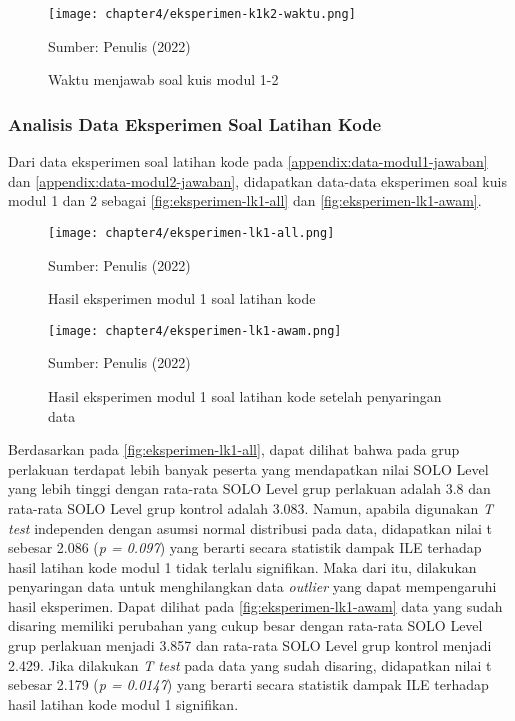 \begin{figure}[!h]
  \centering
  \texttt{[image: chapter4/eksperimen-k1k2-waktu.png]}
  \caption{Waktu menjawab soal kuis modul 1-2} \label{fig:eksperimen-k1k2-waktu}
  Sumber: Penulis (2022)
\end{figure}

\subsubsection{Analisis Data Eksperimen Soal Latihan Kode}

Dari data eksperimen soal latihan kode pada \autoref{appendix:data-modul1-jawaban} dan \autoref{appendix:data-modul2-jawaban}, didapatkan data-data eksperimen soal kuis modul 1 dan 2 sebagai \autoref{fig:eksperimen-lk1-all} dan \autoref{fig:eksperimen-lk1-awam}.

\begin{figure}[!h]
  \centering
  \texttt{[image: chapter4/eksperimen-lk1-all.png]}
  \caption{Hasil eksperimen modul 1 soal latihan kode} \label{fig:eksperimen-lk1-all}
  Sumber: Penulis (2022)
\end{figure}
\begin{figure}[!h]
  \centering
  \texttt{[image: chapter4/eksperimen-lk1-awam.png]}
  \caption{Hasil eksperimen modul 1 soal latihan kode setelah penyaringan data} \label{fig:eksperimen-lk1-awam}
  Sumber: Penulis (2022)
\end{figure}

Berdasarkan pada \autoref{fig:eksperimen-lk1-all}, dapat dilihat bahwa pada grup perlakuan terdapat lebih banyak peserta yang mendapatkan nilai SOLO Level yang lebih tinggi dengan rata-rata SOLO Level grup perlakuan adalah 3.8 dan rata-rata SOLO Level grup kontrol adalah 3.083. Namun, apabila digunakan \textit{T test} independen dengan asumsi normal distribusi pada data, didapatkan nilai t sebesar 2.086 (\textit{p = 0.097}) yang berarti secara statistik dampak ILE terhadap hasil latihan kode modul 1 tidak terlalu signifikan. Maka dari itu, dilakukan penyaringan data untuk menghilangkan data \textit{outlier} yang dapat mempengaruhi hasil eksperimen. Dapat dilihat pada \autoref{fig:eksperimen-lk1-awam} data yang sudah disaring memiliki perubahan yang cukup besar dengan rata-rata SOLO Level grup perlakuan menjadi 3.857 dan rata-rata SOLO Level grup kontrol menjadi 2.429. Jika dilakukan \textit{T test} pada data yang sudah disaring, didapatkan nilai t sebesar 2.179 (\textit{p = 0.0147}) yang berarti secara statistik dampak ILE terhadap hasil latihan kode modul 1 signifikan.

